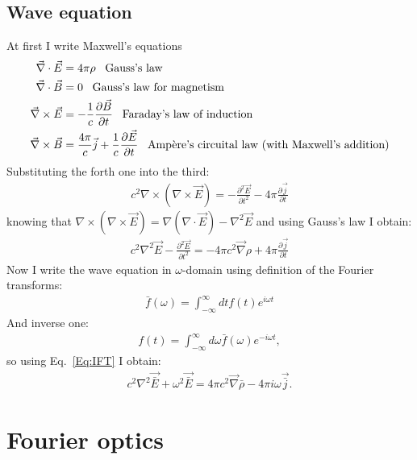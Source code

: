     \subsection{Wave equation}
    At first I write Maxwell's equations 
    \begin{align}
        \
        \vec{\nabla} \cdot \vec{E} &= 4 \pi \rho \;\;\; \textup{Gauss's law}\\
        \vec{\nabla} \cdot \vec{B} &= 0 \;\;\; \textup{Gauss's law for magnetism}\\
        \vec{\nabla} \times \vec{E} &= - \frac{1}{c} \frac{\partial \vec{B}}{\partial t} \;\;\; \textup{Faraday's law of induction}\\
        \vec{\nabla} \times \vec{B} &= \frac{4 \pi}{c} \vec{j} + \frac{1}{c} \frac{\partial \vec{E}}{\partial t} \;\;\; \textup{Ampère's circuital law (with Maxwell's addition)}
    \end{align}
    Substituting the forth one into the third:
    \begin{align}
        c^2 \nabla \times (\nabla \times \vec{E}) = - \frac{\partial^2 \vec{E}}{\partial t^2} - 4 \pi \frac{\partial \vec{j}}{\partial t}
    \end{align}
    knowing that $\nabla\times (\nabla \times \vec{E}) = \nabla(\nabla \cdot \vec{E}) - \nabla^2 \vec{E}$ and using Gauss's law I obtain:
    \begin{align}
        c^2 \nabla^2 \vec{E} - \frac{\partial^2 \vec{E}}{\partial t^2} = - 4 \pi c^2 \vec{\nabla} \rho + 4 \pi \frac{\partial \vec{j}}{\partial t}
    \end{align}
    Now I write the wave equation in $\omega$-domain using definition of the Fourier transforms:
    \begin{align}
        \bar{f}(\omega) = \int_{-\infty}^{\infty} dt f(t) e^{i \omega t}
    \end{align}
    And inverse one:
    \begin{align}
        f(t) = \int_{-\infty}^{\infty} d\omega \bar{f}(\omega) e^{-i \omega t},
        \label{Eq:IFT}
    \end{align}
    so using Eq.~\ref{Eq:IFT} I obtain:
    \begin{align}
        c^2 \nabla^2 \vec{\bar{E}} + \omega^2 \vec{\bar{E}} = 4 \pi c^2 \vec{\nabla} \bar{\rho} - 4 \pi i \omega \vec{\bar{j}}.
        \label{Eq:Helmholtz_eq}
    \end{align}

\section{Fourier optics}

